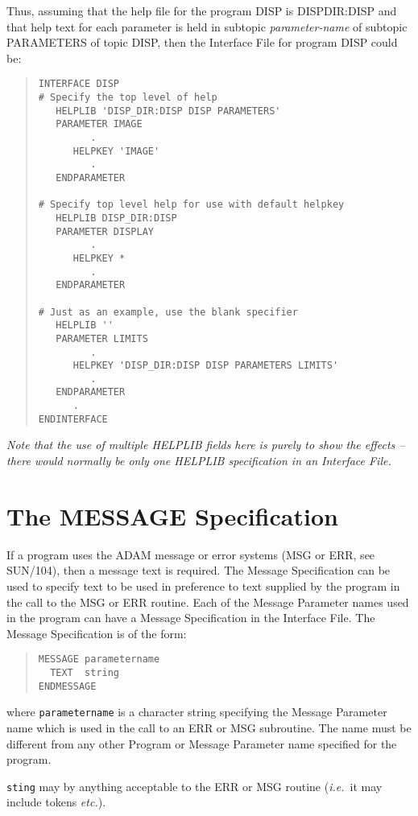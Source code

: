 \documentclass[twoside,11pt]{article}
\newcommand{\xref}[3]{#1}
\newcommand{\xlabel}[1]{}
\renewcommand{\_}{\texttt{\symbol{95}}}
\begin{document}
Thus, assuming that the help file for the program DISP is
DISP\_DIR:DISP and that help text for each parameter is held in subtopic
{\em parameter-name} of subtopic PARAMETERS of topic DISP, then
the Interface File for program DISP could be:
\begin{quote} \begin{verbatim}
INTERFACE DISP
# Specify the top level of help
   HELPLIB 'DISP_DIR:DISP DISP PARAMETERS'
   PARAMETER IMAGE
         .
      HELPKEY 'IMAGE'
         .
   ENDPARAMETER

# Specify top level help for use with default helpkey
   HELPLIB DISP_DIR:DISP
   PARAMETER DISPLAY
         .
      HELPKEY *
         .
   ENDPARAMETER

# Just as an example, use the blank specifier
   HELPLIB ''
   PARAMETER LIMITS
         .
      HELPKEY 'DISP_DIR:DISP DISP PARAMETERS LIMITS'
         .
   ENDPARAMETER
      .
ENDINTERFACE
\end{verbatim} \end{quote}
{\em Note that the use of multiple HELPLIB fields here is purely to show the
effects -- there would normally be only one HELPLIB specification in
an Interface File.}

\section{The MESSAGE Specification\xlabel{the_message_specification}}

If a program uses the ADAM message or error systems (MSG or ERR, see
\xref{SUN/104}{sun104}{}), then a message text is required.
The Message Specification can be used to specify text to be used in preference
to text supplied by the program in the call to the MSG or ERR routine.
Each of the Message Parameter names used in the program can have
a Message Specification in the Interface File. The Message Specification
is of the form:
\begin{quote} \begin{verbatim}
MESSAGE parametername
  TEXT  string
ENDMESSAGE
\end{verbatim} \end{quote}
where \texttt{parametername} is a character string specifying the Message
Parameter name which is used in the call to an ERR or MSG subroutine.
The name must be different from any other Program or Message Parameter name
specified for the program.

\texttt{sting} may by anything acceptable to the ERR or MSG routine
({\em i.e.}\ it may include tokens {\em etc.}).
\end{document}
